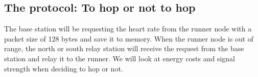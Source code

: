 \subsection{The protocol: To hop or not to hop}

The base station will be requesting the heart rate from the runner node with a packet size of 128 bytes and save it to memory. When the runner node is out of range, the north or south relay station will receive the request from the base station and relay it to the runner. We will look at energy costs and signal strength when deciding to hop or not.